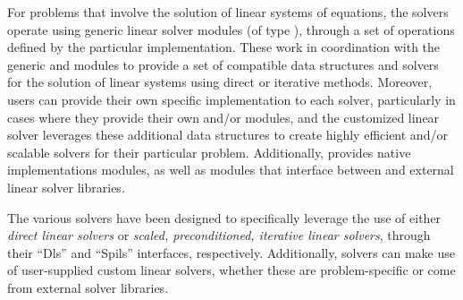 %
For problems that involve the solution of linear systems of equations,
the {\sundials} solvers operate using generic linear solver modules
(of type ), through a set of operations defined by
the particular {\sunlinsol} implementation.  These work in
coordination with the {\sundials} generic {\nvector} and {\sunmatrix}
modules to provide a set of compatible data structures and solvers for
the solution of linear systems using direct or iterative methods.
Moreover, users can provide their own specific {\sunlinsol}
implementation to each {\sundials} solver, particularly in cases where
they provide their own {\nvector} and/or {\sunmatrix} modules, and the
customized linear solver leverages these additional data structures
to create highly efficient and/or scalable solvers for their
particular problem.  Additionally, {\sundials} provides native
implementations {\sunlinsol} modules, as well as {\sunlinsol} modules
that interface between {\sundials} and external
linear solver libraries.

The various {\sundials} solvers have been designed to specifically
leverage the use of either \emph{direct linear solvers}
or \emph{scaled, preconditioned, iterative linear solvers}, through
their ``Dls'' and ``Spils'' interfaces, respectively.  Additionally,
{\sundials} solvers can make use of user-supplied custom linear
solvers, whether these are problem-specific or come from external
solver libraries.


